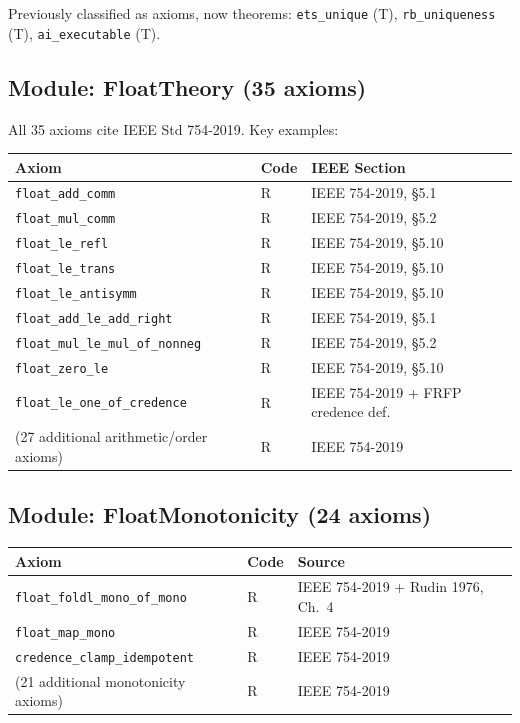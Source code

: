 Previously classified as axioms, now theorems: \texttt{ets\_unique} (T),
\texttt{rb\_uniqueness} (T), \texttt{ai\_executable} (T).

\subsection*{Module: FloatTheory (35 axioms)}

All 35 axioms cite IEEE Std 754-2019. Key examples:

\begin{center}
\begin{tabular}{lll}
\toprule
Axiom & Code & IEEE Section \\
\midrule
\texttt{float\_add\_comm} & R & IEEE 754-2019, §5.1 \\
\texttt{float\_mul\_comm} & R & IEEE 754-2019, §5.2 \\
\texttt{float\_le\_refl} & R & IEEE 754-2019, §5.10 \\
\texttt{float\_le\_trans} & R & IEEE 754-2019, §5.10 \\
\texttt{float\_le\_antisymm} & R & IEEE 754-2019, §5.10 \\
\texttt{float\_add\_le\_add\_right} & R & IEEE 754-2019, §5.1 \\
\texttt{float\_mul\_le\_mul\_of\_nonneg} & R & IEEE 754-2019, §5.2 \\
\texttt{float\_zero\_le} & R & IEEE 754-2019, §5.10 \\
\texttt{float\_le\_one\_of\_credence} & R & IEEE 754-2019 + FRFP credence def. \\
(27 additional arithmetic/order axioms) & R & IEEE 754-2019 \\
\bottomrule
\end{tabular}
\end{center}

\subsection*{Module: FloatMonotonicity (24 axioms)}

\begin{center}
\begin{tabular}{lll}
\toprule
Axiom & Code & Source \\
\midrule
\texttt{float\_foldl\_mono\_of\_mono} & R & IEEE 754-2019 + Rudin 1976, Ch.~4 \\
\texttt{float\_map\_mono} & R & IEEE 754-2019 \\
\texttt{credence\_clamp\_idempotent} & R & IEEE 754-2019 \\
(21 additional monotonicity axioms) & R & IEEE 754-2019 \\
\bottomrule
\end{tabular}
\end{center}


